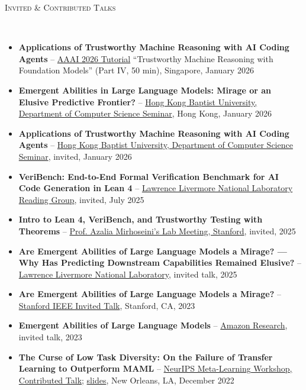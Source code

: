 \documentclass{article}
\newenvironment{changemargin}[2]{%
  \begin{list}{}{%
    \setlength{\topsep}{0pt}%
    \setlength{\leftmargin}{#1}%
    \setlength{\rightmargin}{#2}%
    \setlength{\listparindent}{\parindent}%
    \setlength{\itemindent}{\parindent}%
    \setlength{\parsep}{\parskip}%
  }%
  \item[]}{\end{list}
}
\newcommand{\lineover}{
	\begin{changemargin}{-0.05in}{-0.05in}
		\vspace*{-8pt}
		\hrulefill \\
		\vspace*{-2pt}
	\end{changemargin}
}
\newcommand{\header}[1]{
	\begin{changemargin}{-0.5in}{-0.5in}
		\scshape{#1}\\
  	\lineover
	\end{changemargin}
	\nopagebreak[4]    %
}
\newenvironment{body} {
		\vspace*{-16pt}
		\begin{changemargin}{-0.25in}{-0.5in}
	  }
		{\end{changemargin}\vspace{8pt plus 12pt}
	}
\begin{document}
\header{Invited \& Contributed Talks}
\begin{body}
\vspace{12pt}
\begin{itemize} \itemsep -2pt
    \item \textbf{Applications of Trustworthy Machine Reasoning with AI Coding Agents} -- \href{https://trustworthy-machine-reasoning.github.io/}{AAAI 2026 Tutorial} ``Trustworthy Machine Reasoning with Foundation Models'' (Part IV, 50 min), Singapore, January 2026
    \item \textbf{Emergent Abilities in Large Language Models: Mirage or an Elusive Predictive Frontier?} -- \href{https://docs.google.com/presentation/d/1J29Rt6C7g8uh6aWUJUIUtuZHdU0ihrWMi8C66XJn9jw/edit?usp=sharing}{Hong Kong Baptist University, Department of Computer Science Seminar}, Hong Kong, January 2026
    \item \textbf{Applications of Trustworthy Machine Reasoning with AI Coding Agents} -- \href{https://docs.google.com/presentation/d/1oHnxUTewe0k9h-SL8RExViJVOUcEPnWmPD_VbD4EzJ0/edit?usp=sharing}{Hong Kong Baptist University, Department of Computer Science Seminar}, invited, January 2026
    \item \textbf{VeriBench: End-to-End Formal Verification Benchmark for AI Code Generation in Lean 4} -- \href{https://docs.google.com/presentation/d/11w7Q9wbfimfs0e87XuLagkhj7Q1lk8Wq-ASM-xJVHdg/edit?usp=sharing}{Lawrence Livermore National Laboratory Reading Group}, invited, July 2025
    \item \textbf{Intro to Lean 4, VeriBench, and Trustworthy Testing with Theorems} -- \href{https://docs.google.com/presentation/d/1KRBym-sOORaxszOJQHdD4u80wAl7jHy8Pda0KAcdeZw/edit?usp=sharing}{Prof. Azalia Mirhoseini's Lab Meeting, Stanford}, invited, 2025
    \item \textbf{Are Emergent Abilities of Large Language Models a Mirage? --- Why Has Predicting Downstream Capabilities Remained Elusive?} -- \href{https://docs.google.com/presentation/d/1cr_X6jzZxShHMUVjzHAkitCnPZCbBfyxxxgZg8S90SI/edit?usp=sharing}{Lawrence Livermore National Laboratory}, invited talk, 2025
    \item \textbf{Are Emergent Abilities of Large Language Models a Mirage?} -- \href{https://docs.google.com/presentation/d/1k-yCVLob1eSyg71jT-k2w2mi--gkTQGAK_H2x3sPqpA/edit?usp=sharing}{Stanford IEEE Invited Talk}, Stanford, CA, 2023
    \item \textbf{Emergent Abilities of Large Language Models} -- \href{https://docs.google.com/presentation/d/1UDqPg06xQKga1oWSEMS2jyzignQwkot6ZbjQMhdZngs/edit?usp=sharing}{Amazon Research}, invited talk, 2023
    \item \textbf{The Curse of Low Task Diversity: On the Failure of Transfer Learning to Outperform MAML} -- \href{https://neurips.cc/virtual/2022/63778}{NeurIPS Meta-Learning Workshop, Contributed Talk}; \href{https://docs.google.com/presentation/d/1nY39x8u8j7k6KpOhD6Vqto78YzLOwyR9B24kuoHJijY/edit?usp=sharing}{slides}, New Orleans, LA, December 2022
\end{itemize}
\end{body}
\end{document}

